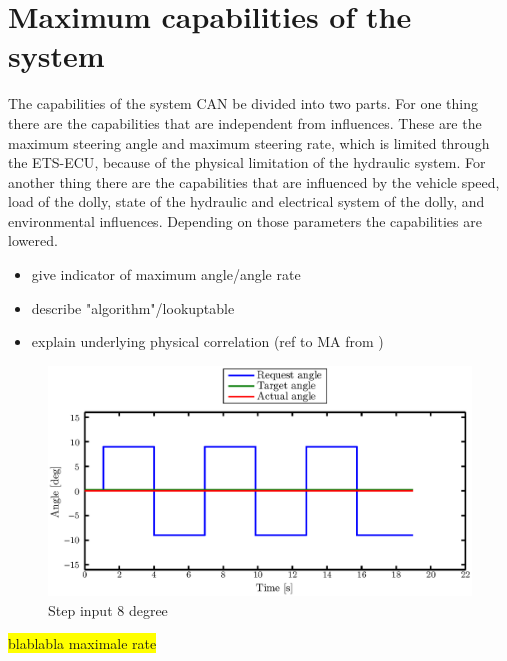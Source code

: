 \documentclass[ExampleMasters.tex]{subfiles}
\begin{document}
\section{Maximum capabilities of the system}
\label{sec:maxi_capabilities}
The capabilities of the system \gls{CAN} be divided into two parts. For one thing there are the capabilities that are independent from influences. These are the maximum steering angle and maximum steering rate, which is limited through the \gls{ETS}-\gls{ECU}, because of the physical limitation of the hydraulic system.
For another thing there are the capabilities that are influenced by the vehicle speed, load of the dolly, state of the hydraulic and electrical system of the dolly, and environmental influences.
Depending on those parameters the capabilities are lowered.
\begin{itemize}
	\item give indicator of maximum angle/angle rate
	\item describe "algorithm"/lookuptable
	\item explain underlying physical correlation (ref to MA from )
\end{itemize}
\begin{figure}[!hbt]
	\centering
	\includegraphics[width=1\linewidth]{figures/step_input_8deg}
	\caption{Step input 8 degree}
	
	\label{fig:max_step_input}
\end{figure}

\colorbox{yellow}{blablabla maximale rate}
\end{document}
